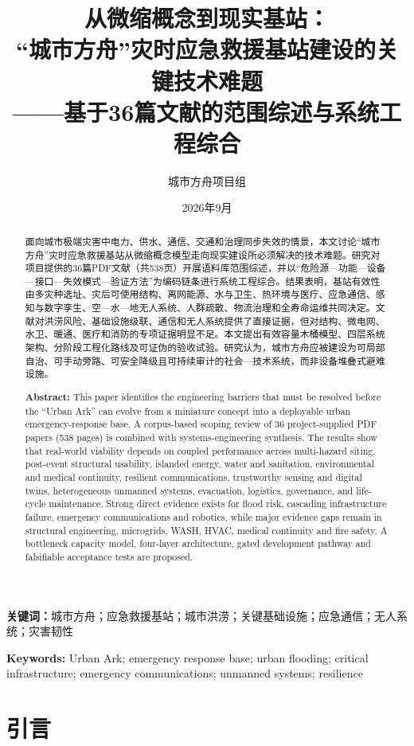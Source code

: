 \documentclass[UTF8,a4paper,zihao=-4]{ctexart}
\title{从微缩概念到现实基站：\\“城市方舟”灾时应急救援基站建设的关键技术难题\\——基于36篇文献的范围综述与系统工程综合}
\author{城市方舟项目组}\date{2026年9月}
\begin{document}
\maketitle
\begin{abstract}
面向城市极端灾害中电力、供水、通信、交通和治理同步失效的情景，本文讨论“城市方舟”灾时应急救援基站从微缩概念模型走向现实建设所必须解决的技术难题。研究对项目提供的36篇PDF文献（共538页）开展语料库范围综述，并以“危险源—功能—设备—接口—失效模式—验证方法”为编码链条进行系统工程综合。结果表明，基站有效性由多灾种选址、灾后可使用结构、离网能源、水与卫生、热环境与医疗、应急通信、感知与数字孪生、空—水—地无人系统、人群疏散、物流治理和全寿命运维共同决定。文献对洪涝风险、基础设施级联、通信和无人系统提供了直接证据，但对结构、微电网、水卫、暖通、医疗和消防的专项证据明显不足。本文提出有效容量木桶模型、四层系统架构、分阶段工程化路线及可证伪的验收试验。研究认为，城市方舟应被建设为可局部自治、可手动旁路、可安全降级且可持续审计的社会—技术系统，而非设备堆叠式避难设施。
\end{abstract}
\noindent\textbf{关键词：}城市方舟；应急救援基站；城市洪涝；关键基础设施；应急通信；无人系统；灾害韧性

\begin{abstract}
\textbf{Abstract:} This paper identifies the engineering barriers that must be resolved before the “Urban Ark” can evolve from a miniature concept into a deployable urban emergency-response base. A corpus-based scoping review of 36 project-supplied PDF papers (538 pages) is combined with systems-engineering synthesis. The results show that real-world viability depends on coupled performance across multi-hazard siting, post-event structural usability, islanded energy, water and sanitation, environmental and medical continuity, resilient communications, trustworthy sensing and digital twins, heterogeneous unmanned systems, evacuation, logistics, governance, and life-cycle maintenance. Strong direct evidence exists for flood risk, cascading infrastructure failure, emergency communications and robotics, while major evidence gaps remain in structural engineering, microgrids, WASH, HVAC, medical continuity and fire safety. A bottleneck capacity model, four-layer architecture, gated development pathway and falsifiable acceptance tests are proposed.
\end{abstract}
\noindent\textbf{Keywords:} Urban Ark; emergency response base; urban flooding; critical infrastructure; emergency communications; unmanned systems; resilience


\section{引言}
\end{document}

